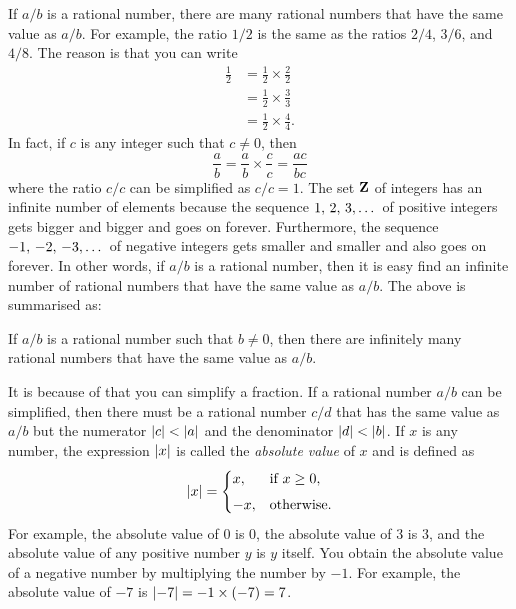 \documentclass[a4paper,oneside,12pt]{article}
\begin{document}

If $a/b$ is a rational number, there are many rational numbers that
have the same value as $a/b$.  For example, the ratio $1/2$ is the
same as the ratios $2/4$, $3/6$, and $4/8$.  The reason is that you
can write
\begin{align*}
\frac{1}{2}
&=
\frac{1}{2} \times \frac{2}{2} \\[4pt]
&=
\frac{1}{2} \times \frac{3}{3} \\[4pt]
&=
\frac{1}{2} \times \frac{4}{4}.
\end{align*}
In fact, if $c$ is any integer such that $c \neq 0$, then
\[
\frac{a}{b}
=
\frac{a}{b} \times \frac{c}{c}
=
\frac{ac}{bc}
\]
where the ratio $c/c$ can be simplified as $c/c = 1$.  The set $\mathbf{Z}$
of integers has an infinite number of elements because the sequence
${1},\, {2},\, {3},\dots$ of positive integers gets bigger and bigger and goes
on forever.  Furthermore, the sequence ${-1},\, {-2},\, {-3},\dots$ of negative
integers gets smaller and smaller and also goes on forever.  In other
words, if $a/b$ is a rational number, then it is easy find an infinite
number of rational numbers that have the same value as $a/b$.  The
above is summarised as:

\begin{theorem}
\label{thm:infinitely_many_rationals_same_value}
If $a/b$ is a rational number such that $b \neq 0$, then there are
infinitely many rational numbers that have the same value as $a/b$.
\end{theorem}

It is because of 
that you can simplify a fraction.  If a rational number $a/b$ can be
simplified, then there must be a rational number $c/d$ that has the
same value as $a/b$ but the numerator
$\lvert c\rvert < \lvert a\rvert$ and the denominator
$\lvert d\rvert < \lvert b\rvert$.  If $x$ is any number, the
expression $\lvert x\rvert$ is called the \emph{absolute value} of
$x$ and is defined as
\[
\lvert x\rvert
=
\begin{cases}
x,  & \text{if $x \geq 0$}, \\[4pt]
-x, & \text{otherwise}.
\end{cases}
\]
For example, the absolute value of $0$ is $0$, the absolute value of
$3$ is $3$, and the absolute value of any positive number $y$ is $y$
itself.  You obtain the absolute value of a negative number by
multiplying the number by $-1$.  For example, the absolute value of
$-7$ is $\lvert-7\rvert = -1 \times (-7) = 7$.
\end{document}
